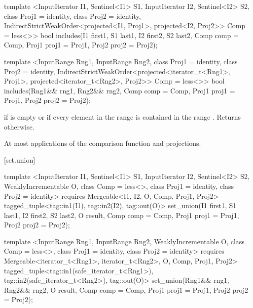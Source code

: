 %
\begin{itemdecl}
template <InputIterator I1, Sentinel<I1> S1, InputIterator I2, Sentinel<I2> S2,
    class Proj1 = identity, class Proj2 = identity,
    IndirectStrictWeakOrder<projected<I1, Proj1>, projected<I2, Proj2>> Comp = less<>>
  bool
    includes(I1 first1, S1 last1, I2 first2, S2 last2, Comp comp = Comp{},
             Proj1 proj1 = Proj1{}, Proj2 proj2 = Proj2{});

template <InputRange Rng1, InputRange Rng2, class Proj1 = identity,
    class Proj2 = identity,
    IndirectStrictWeakOrder<projected<iterator_t<Rng1>, Proj1>,
      projected<iterator_t<Rng2>, Proj2>> Comp = less<>>
  bool
    includes(Rng1&& rng1, Rng2&& rng2, Comp comp = Comp{},
             Proj1 proj1 = Proj1{}, Proj2 proj2 = Proj2{});
\end{itemdecl}

\begin{itemdescr}
\pnum
\returns
{}
if  is empty or
if every element in the range
is contained in the range
.
Returns
otherwise.

\pnum
\complexity
At most
applications of the comparison function and projections.
\end{itemdescr}

[set.union]{}

%
\begin{itemdecl}
template <InputIterator I1, Sentinel<I1> S1, InputIterator I2, Sentinel<I2> S2,
    WeaklyIncrementable O, class Comp = less<>, class Proj1 = identity, class Proj2 = identity>
  requires Mergeable<I1, I2, O, Comp, Proj1, Proj2>
  tagged_tuple<tag::in1(I1), tag::in2(I2), tag::out(O)>
    set_union(I1 first1, S1 last1, I2 first2, S2 last2, O result, Comp comp = Comp{},
              Proj1 proj1 = Proj1{}, Proj2 proj2 = Proj2{});

template <InputRange Rng1, InputRange Rng2, WeaklyIncrementable O,
    class Comp = less<>, class Proj1 = identity, class Proj2 = identity>
  requires Mergeable<iterator_t<Rng1>, iterator_t<Rng2>, O, Comp, Proj1, Proj2>
  tagged_tuple<tag::in1(safe_iterator_t<Rng1>),
               tag::in2(safe_iterator_t<Rng2>),
               tag::out(O)>
    set_union(Rng1&& rng1, Rng2&& rng2, O result, Comp comp = Comp{},
              Proj1 proj1 = Proj1{}, Proj2 proj2 = Proj2{});
\end{itemdecl}

